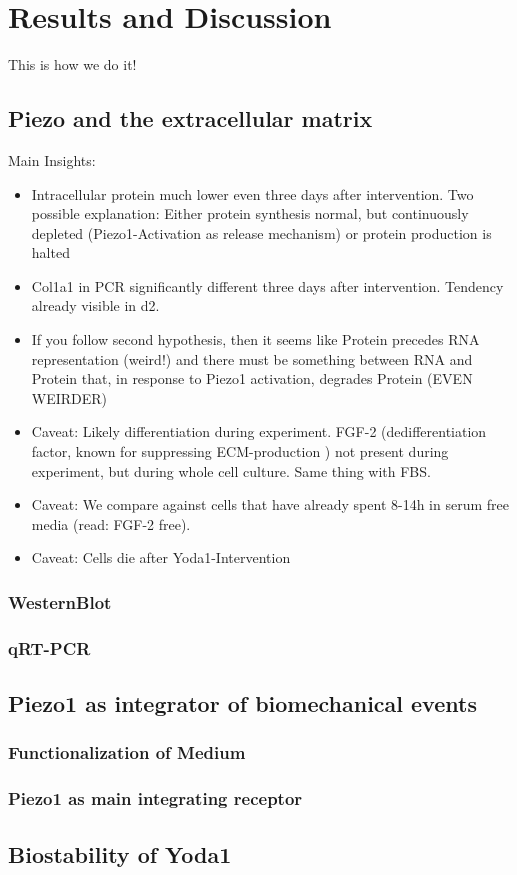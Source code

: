 \chapter{Results and Discussion}

This is how we do it! 
\section{Piezo and the extracellular matrix}

Main Insights:
\begin{itemize}
    \item Intracellular protein much lower even three days after intervention. Two possible explanation: Either protein synthesis normal, but continuously depleted (Piezo1-Activation as release mechanism)  or protein production is halted
    \item Col1a1 in PCR significantly different three days after intervention. Tendency already visible in d2.
    \item If you follow second hypothesis, then it seems like Protein precedes RNA representation (weird!) and there must be something between RNA and Protein that, in response to Piezo1 activation, degrades Protein (EVEN WEIRDER)
     \item  Caveat: Likely differentiation during experiment. FGF-2 (dedifferentiation factor, known for suppressing ECM-production ) not present during experiment, but during whole cell culture. Same thing with FBS. 
     \item Caveat: We compare against cells that have already spent 8-14h in serum free media (read: FGF-2 free).
    \item Caveat: Cells die after Yoda1-Intervention
\end{itemize}

\subsection{WesternBlot}
\subsection{qRT-PCR}

\section{Piezo1 as integrator of biomechanical events}
\subsection{Functionalization of Medium}
\subsection{Piezo1 as main integrating receptor}

\section{Biostability of Yoda1}
\kant[42][1-3]